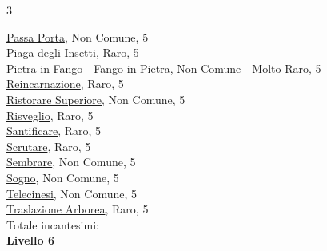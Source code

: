 \begin{multicols}{3}
{{\hyperlink{Passa Porta}{Passa Porta}, Non Comune, 5\\
\hyperlink{Piaga degli Insetti}{Piaga degli Insetti}, Raro, 5\\
\hyperlink{Pietra in Fango}{Pietra in Fango - Fango in Pietra}, Non Comune - Molto Raro, 5\\
\hyperlink{Reincarnazione}{Reincarnazione}, Raro, 5\\
\hyperlink{Ristorare Superiore}{Ristorare Superiore}, Non Comune, 5\\
\hyperlink{Risveglio}{Risveglio}, Raro, 5\\
\hyperlink{Santificare}{Santificare}, Raro, 5\\
\hyperlink{Scrutare}{Scrutare}, Raro, 5\\
\hyperlink{Sembrare}{Sembrare}, Non Comune, 5\\
\hyperlink{Sogno}{Sogno}, Non Comune, 5\\
\hyperlink{Telecinesi}{Telecinesi}, Non Comune, 5\\
\hyperlink{Traslazione Arborea}{Traslazione Arborea}, Raro, 5\\

\medskip Totale incantesimi: \theinclvcinque\\

\textbf{Livello 6} 

}}
\end{multicols}
